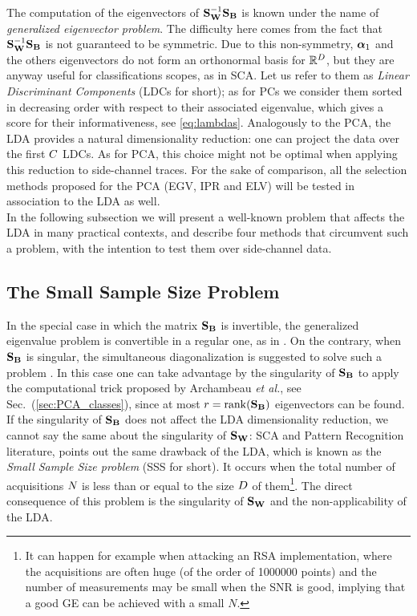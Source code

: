 The computation of the eigenvectors of $\SW^{-1} \SB$ is known under the name of {\em generalized eigenvector problem}. The difficulty here comes from the fact that $\SW^{-1} \SB$ is not guaranteed to be symmetric. Due to this non-symmetry,  $\AAlpha_1$ and the others eigenvectors do not form an orthonormal basis for $\mathbb{R}^\traceLength$, but they are anyway useful for classifications scopes, as in SCA. Let us refer to them as {\em Linear Discriminant Components} (LDCs for short); as for PCs we consider them sorted in decreasing order with respect to their associated eigenvalue, which gives a score for their informativeness, see \eqref{eq:lambdas}. Analogously to the PCA, the LDA provides a natural dimensionality reduction: one can project the data over the first $\newTraceLength$ LDCs. As for PCA, this choice might not be optimal when applying this reduction to side-channel traces. For the sake of comparison, all the selection methods proposed for the PCA (EGV, IPR and ELV) will be tested in association to the LDA as well.\\

In the following subsection we will present a well-known problem that affects the LDA in many practical contexts, and describe four methods that circumvent such a problem, with the intention to test them over side-channel data.



\subsection{The Small Sample Size Problem}\label{sec:SSS}
In the special case in which the matrix $\SB$ is invertible, the generalized eigenvalue problem is convertible in a regular one, as in \cite{Standaert2008}. On the contrary, when $\SB$ is singular, the simultaneous diagonalization is suggested to solve such a problem \cite{Fukunaga}. In this case one can take advantage by the singularity of $\SB$ to apply the computational trick proposed by Archambeau \textit{et al.}, see Sec.~(\ref{sec:PCA_classes}), since at most $r = \mathrm{rank}(\SB)$ eigenvectors can be found.\\

If the singularity of $\SB$ does not affect the LDA dimensionality reduction, we cannot say the same about the singularity of $\SW$:  SCA and Pattern Recognition literature, points out the same drawback of the LDA, which is known as the {\em Small Sample Size problem} (SSS for short). It occurs when the total number of acquisitions $\numTraces[]$ is less than or equal to the size $\traceLength$ of them\footnote{It can happen for example when attacking an RSA implementation, where the acquisitions are often huge (of the order of 1000000 points) and the number of measurements may be small when the SNR is good, implying that a good GE can be achieved with a small $N$.}. The direct consequence of this problem is the singularity of $\SW$ and the non-applicability of the LDA. \\

